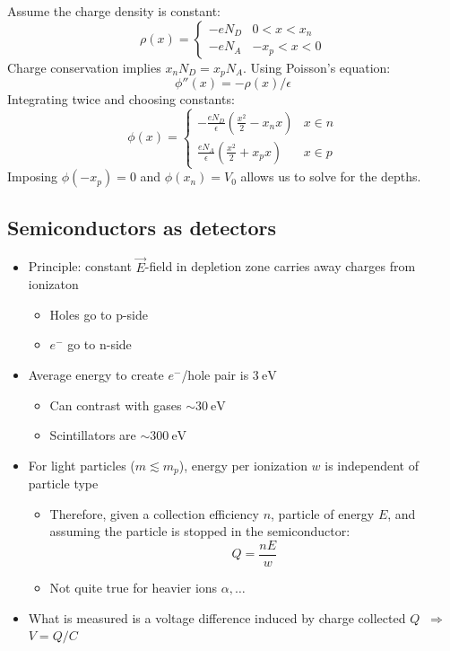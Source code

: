 \documentclass[11pt]{article}
\newcommand{\E}{\ensuremath{\vec{E}}}
\newcommand{\ev}{\text{eV}}
\newcommand{\el}{\ensuremath{e^{-}}\xspace}
\newcommand{\thus}{$~\Rightarrow~$}
\begin{document}
\noindent Assume the charge density is constant:
\begin{equation}
  \rho(x) = \begin{cases} - eN_D & 0 < x < x_n \\ - eN_A & -x_p < x < 0 \end{cases}
\end{equation}
Charge conservation implies $x_n N_D = x_p N_A$.  Using Poisson's equation:
\begin{equation}
  \phi''(x) = -\rho(x)/\epsilon
\end{equation}
Integrating twice and choosing constants:
\begin{equation}
  \phi(x) = \begin{cases} - \frac{eN_D}{\epsilon} \left(\frac{x^2}{2}-x_n x\right) & x\in n \\ \frac{eN_A}{\epsilon} \left(\frac{x^2}{2}+x_px\right) & x\in p \end{cases}
\end{equation}
Imposing $\phi(-x_p)=0$ and $\phi(x_n)=V_0$ allows us to solve for the depths.

\subsection{Semiconductors as detectors}
\begin{itemize}
  \item Principle: constant \E-field in depletion zone carries away charges from ionizaton
  \begin{itemize}
    \item Holes go to p-side
    \item \el go to n-side
  \end{itemize}
  \item Average energy to create \el/hole pair is $3~\ev$
  \begin{itemize}
    \item Can contrast with gases $\sim30~\ev$
    \item Scintillators are $\sim300~\ev$
  \end{itemize}
  \item For light particles ($m\lesssim m_p$), energy per ionization $w$ is independent of particle type
  \begin{itemize}
    \item Therefore, given a collection efficiency $n$, particle of energy $E$, and assuming the particle is stopped in the semiconductor:
    \begin{equation}
      Q = \frac{nE}{w}
    \end{equation}
    \item Not quite true for heavier ions $\alpha,\dots$
  \end{itemize}
  \item What is measured is a voltage difference induced by charge collected $Q$ \thus $V=Q/C$
\end{itemize}
\end{document}
